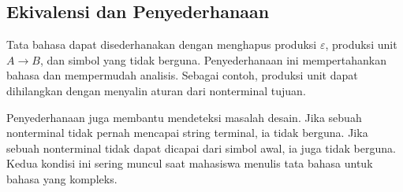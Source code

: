 \subsection{Ekivalensi dan Penyederhanaan}

Tata bahasa dapat disederhanakan dengan menghapus produksi
\(\varepsilon\), produksi unit \(A \to B\), dan simbol yang tidak
berguna. Penyederhanaan ini mempertahankan bahasa dan mempermudah
analisis. Sebagai contoh, produksi unit dapat dihilangkan dengan
menyalin aturan dari nonterminal tujuan.

Penyederhanaan juga membantu mendeteksi masalah desain. Jika sebuah
nonterminal tidak pernah mencapai string terminal, ia tidak berguna.
Jika sebuah nonterminal tidak dapat dicapai dari simbol awal, ia juga
tidak berguna. Kedua kondisi ini sering muncul saat mahasiswa menulis
tata bahasa untuk bahasa yang kompleks.
